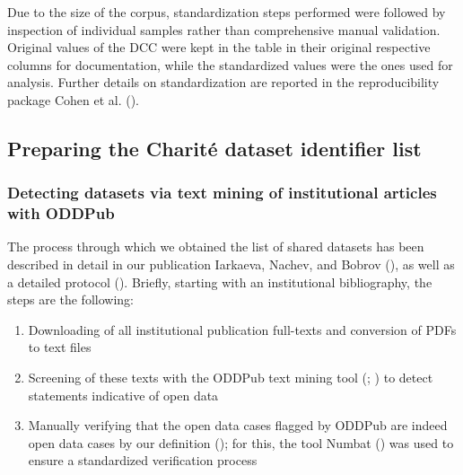 \documentclass[
  letterpaper,
  DIV=11,
  numbers=noendperiod]{scrartcl}
\providecommand{\tightlist}{%
  \setlength{\itemsep}{0pt}\setlength{\parskip}{0pt}}\usepackage{longtable,booktabs,array}
\begin{document}
Due to the size of the corpus, standardization steps performed were
followed by inspection of individual samples rather than comprehensive
manual validation. Original values of the DCC were kept in the table in
their original respective columns for documentation, while the
standardized values were the ones used for analysis. Further details on
standardization are reported in the reproducibility package Cohen et al.
().

\subsection{Preparing the Charité dataset identifier
list}\label{sec-methods-charite}

\subsubsection{Detecting datasets via text mining of institutional
articles with ODDPub}\label{sec-methods-charite-oddpub}

The process through which we obtained the list of shared datasets has
been described in detail in our publication Iarkaeva, Nachev, and Bobrov
(), as well
as a detailed protocol
(). Briefly, starting with an institutional bibliography, the
steps are the following:

\begin{enumerate}
\def\labelenumi{(\arabic{enumi})}
\tightlist
\item
  Downloading of all institutional publication full-texts and conversion
  of PDFs to text files
\item
  Screening of these texts with the ODDPub text mining tool
  (;
  ) to detect
  statements indicative of open data
\item
  Manually verifying that the open data cases flagged by ODDPub are
  indeed open data cases by our definition
  (); for this, the tool Numbat
  () was used to ensure a
  standardized verification process
\end{enumerate}
\end{document}
